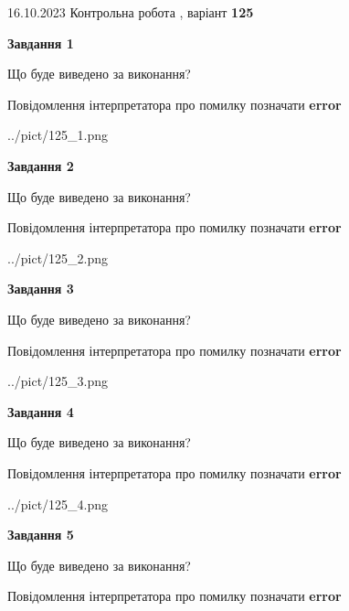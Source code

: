 \documentclass[12pt, ukrainian]{article}
\begin{document}
{\Large{16.10.2023 Контрольна робота , варіант  \No \textbf { 125 }\par}}
{
\begin {large}
{\begin {center}\textbf{Завдання 1}\end {center}}\par
Що буде виведено за виконання? \par
Повідомлення інтерпретатора про помилку позначати \textbf{error}

\begin{center}
	{../pict/125_1.png}
\end{center}
\newpage

{\begin {center}\textbf{Завдання 2}\end {center}}\par
Що буде виведено за виконання? \par
Повідомлення інтерпретатора про помилку позначати \textbf{error}

\begin{center}
	{../pict/125_2.png}
\end{center}
\newpage

{\begin {center}\textbf{Завдання 3}\end {center}}\par
Що буде виведено за виконання? \par
Повідомлення інтерпретатора про помилку позначати \textbf{error}

\begin{center}
	{../pict/125_3.png}
\end{center}
\newpage

{\begin {center}\textbf{Завдання 4}\end {center}}\par
Що буде виведено за виконання? \par
Повідомлення інтерпретатора про помилку позначати \textbf{error}

\begin{center}
	{../pict/125_4.png}
\end{center}
\newpage

{\begin {center}\textbf{Завдання 5}\end {center}}\par
Що буде виведено за виконання? \par
Повідомлення інтерпретатора про помилку позначати \textbf{error}


\end{large}}
\end{document}
